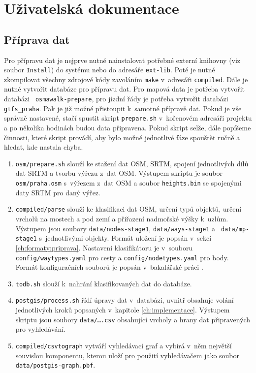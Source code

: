 \chapter{Uživatelská dokumentace}
\label{ch:uzivatelska-dokumentace}
\section{Příprava dat}
Pro přípravu dat je nejprve nutné nainstalovat potřebné externí knihovny (viz
soubor {\tt Install}) do
systému nebo do adresáře {\tt ext-lib}. Poté je nutné zkompilovat všechny zdrojové
kódy zavoláním {\tt make} v~adresáři {\tt compiled}. Dále je nutné vytvořit databáze
pro přípravu dat. Pro mapová data je potřeba vytvořit databázi {\tt
osmawalk-prepare},
pro jízdní řády je potřeba vytvořit databázi {\tt gtfs\_praha}. Pak je již možné
přistoupit k~samotné přípravě dat. Pokud je vše správně nastavené, stačí spustit
skript {\tt prepare.sh} v~kořenovém adresáři projektu a po několika hodinách
budou data připravena. Pokud skript selže, dále popíšeme činnosti, které skript
provádí, aby bylo možné jednotlivé fáze spouštět ručně a hledat, kde nastala chyba.

\begin{enumerate}
\item {\tt osm/prepare.sh} slouží ke stažení dat OSM, SRTM, spojení jednotlivých
dílů dat SRTM a tvorbu výřezu z~dat OSM. Výstupem skriptu je soubor {\tt osm/praha.osm}
s~výřezem z~dat OSM a soubor {\tt heights.bin} se spojenými daty SRTM pro daný
výřez. 
\item {\tt compiled/parse} slouží ke klasifikaci dat OSM, určení typů objektů,
určení vrcholů na mostech a pod zemí a přiřazení nadmořské výšky k~uzlům.
Výstupem jsou soubory {\tt data/nodes-stage1}, {\tt data/ways-stage1} a {\tt
data/mp-stage1} s~jednotlivými objekty. Formát uložení je popsán v~sekci
\ref{ch:formaty:priprava}. Nastavení klasifikátoru je v~souboru {\tt
config/waytypes.yaml} pro cesty a {\tt config/nodetypes.yaml} pro body. Formát
konfiguračních souborů je popsán v~bakalářské práci \cite{bakalarka}.
\item {\tt todb.sh} slouží k~nahrání klasifikovaných dat do databáze. 
\item {\tt postgis/process.sh} řídí úpravy dat v~databázi, uvnitř obsahuje
volání jednotlivých kroků popsaných v~kapitole \ref{ch:implementace}.
Výstupem skriptu jsou soubory {\tt data/\dots.csv} obsahující vrcholy a hrany dat
připravených pro vyhledávání. 
\item {\tt compiled/csvtograph} vytváří vyhledávací graf a vybírá v~něm největší
souvislou komponentu, kterou uloží pro použití vyhledávačem jako soubor {\tt
data/postgis-graph.pbf}.
\end{enumerate}

